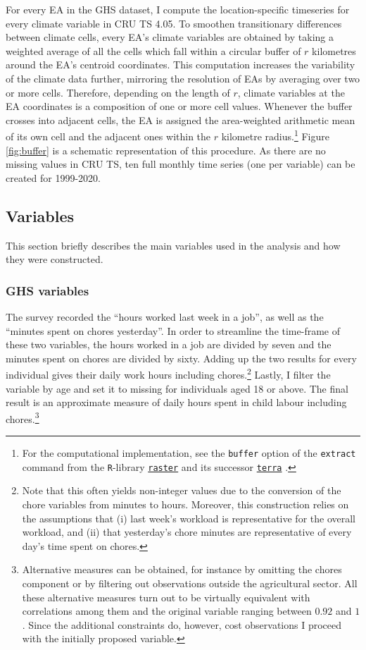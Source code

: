 \documentclass[a4paper,12pt]{article}
\theoremstyle{plain}
\theoremstyle{definition}
\theoremstyle{definition}
\theoremstyle{definition}
\theoremstyle{definition}
\begin{document}
For every EA in the GHS dataset, I compute the location-specific timeseries for every climate variable in CRU TS 4.05. To smoothen transitionary differences between climate cells, every EA's climate variables are obtained by taking a weighted average of all the cells which fall within a circular buffer of $r$ kilometres around the EA's centroid coordinates. This computation increases the variability of the climate data further, mirroring the resolution of EAs by averaging over two or more cells. Therefore, depending on the length of $r$, climate variables at the EA coordinates is a composition of one or more cell values. Whenever the buffer crosses into adjacent cells, the EA is assigned the area-weighted arithmetic mean of its own cell and the adjacent ones within the $r$ kilometre radius.\footnote{For the computational implementation, see the \texttt{buffer} option of the \texttt{extract} command from the \texttt{R}-library \href{https://cran.r-project.org/web/packages/raster}{\texttt{raster}} \citep{hijmans2020} and its successor \href{https://cran.r-project.org/web/packages/terra}{\texttt{terra}} \citep{hijmans2021}.} Figure \ref{fig:buffer} is a schematic representation of this procedure. As there are no missing values in CRU TS, ten full monthly time series (one per variable) can be created for 1999-2020.

\subsection{Variables}
\label{sub:variables}

This section briefly describes the main variables used in the analysis and how they were constructed.

\subsubsection{GHS variables}
\label{subsub:ghsvars}
The survey recorded the ``hours worked last week in a job'', as well as the ``minutes spent on chores yesterday''. In order to streamline the time-frame of these two variables, the hours worked in a job are divided by seven and the minutes spent on chores are divided by sixty. Adding up the two results for every individual gives their daily work hours including chores.\footnote{Note that this often yields non-integer values due to the conversion of the chore variables from minutes to hours. Moreover, this construction relies on the assumptions that (i) last week's workload is representative for the overall workload, and (ii) that yesterday's chore minutes are representative of every day's time spent on chores.} Lastly, I filter the variable by age and set it to missing for individuals aged 18 or above. The final result is an approximate measure of daily hours spent in child labour including chores.\footnote{Alternative measures can be obtained, for instance by omitting the chores component or by filtering out observations outside the agricultural sector. All these alternative measures turn out to be virtually equivalent with correlations among them and the original variable ranging between $0.92$ and $1$. Since the additional constraints do, however, cost observations I proceed with the initially proposed variable.}
\end{document}
